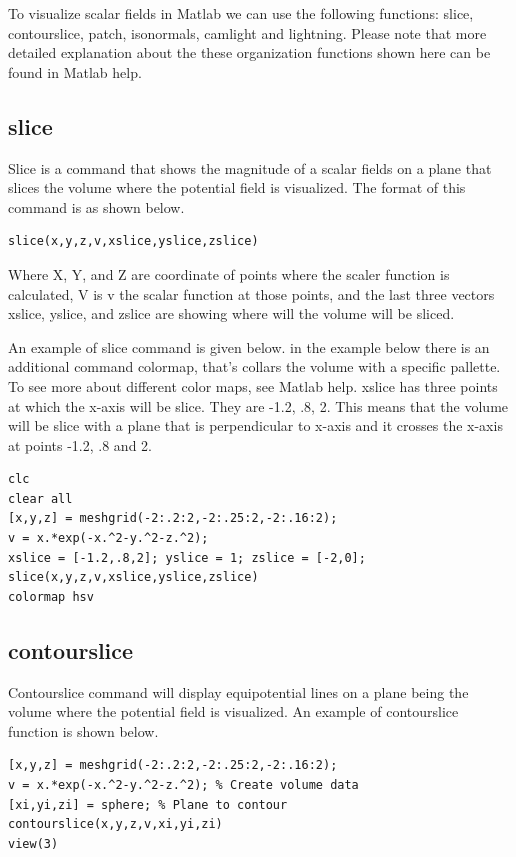 \documentclass{ximera}
\begin{document}
To visualize scalar fields in Matlab we can use the following functions: slice, contourslice, patch, isonormals, camlight and lightning. Please note that more detailed explanation about the these organization functions shown here can be found in Matlab help.

\subsection{slice}
 
Slice is a command that shows the magnitude of a scalar fields on a plane that slices the volume where the potential field is visualized. The format of this command is as shown below.

\begin{verbatim}
slice(x,y,z,v,xslice,yslice,zslice)
\end{verbatim}

Where X, Y, and Z are coordinate of points where the scaler function is calculated, V is v the scalar function at those points, and the last three vectors xslice, yslice, and zslice  are showing where will the volume will be sliced.

An example of slice command is given below. in the example below there is an additional command colormap, that's collars the volume with a specific pallette. To see more about different color maps, see Matlab help. xslice has three points at which the x-axis will be slice. They are -1.2, .8, 2. This means that the volume will be slice with a plane that is perpendicular to x-axis and it crosses the x-axis at points -1.2, .8 and 2. 
 
\begin{verbatim}
clc
clear all
[x,y,z] = meshgrid(-2:.2:2,-2:.25:2,-2:.16:2);
v = x.*exp(-x.^2-y.^2-z.^2);
xslice = [-1.2,.8,2]; yslice = 1; zslice = [-2,0];
slice(x,y,z,v,xslice,yslice,zslice)
colormap hsv
\end{verbatim}

\subsection{contourslice}

 Contourslice command will display equipotential  lines on a plane being the volume where the potential field is visualized. An example of contourslice function is shown below.

\begin{verbatim}
[x,y,z] = meshgrid(-2:.2:2,-2:.25:2,-2:.16:2);
v = x.*exp(-x.^2-y.^2-z.^2); % Create volume data
[xi,yi,zi] = sphere; % Plane to contour
contourslice(x,y,z,v,xi,yi,zi)
view(3)
\end{verbatim}
\end{document}
